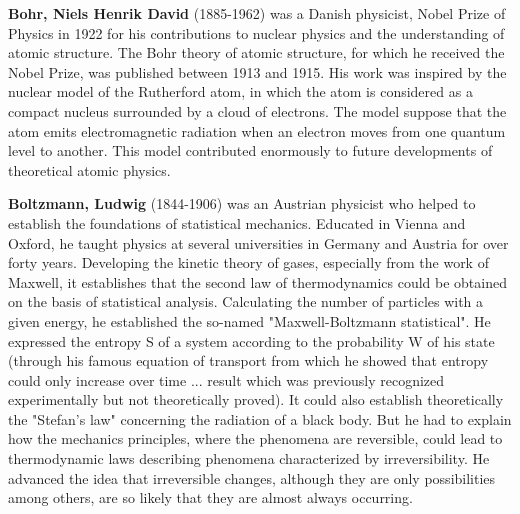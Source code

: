\textbf{Bohr, Niels Henrik David} (1885-1962) was a Danish physicist, Nobel Prize of Physics in 1922 for his contributions to nuclear physics and the understanding of atomic structure. The Bohr theory of atomic structure, for which he received the Nobel Prize, was published between 1913 and 1915. His work was inspired by the nuclear model of the Rutherford atom, in which the atom is considered as a compact nucleus surrounded by a cloud of electrons. The model suppose that the atom emits electromagnetic radiation when an electron moves from one quantum level to another. This model contributed enormously to future developments of theoretical atomic physics.

\textbf{Boltzmann, Ludwig} (1844-1906) was an Austrian physicist who helped to establish the foundations of statistical mechanics. Educated in Vienna and Oxford, he taught physics at several universities in Germany and Austria for over forty years. Developing the kinetic theory of gases, especially from the work of Maxwell, it establishes that the second law of thermodynamics could be obtained on the basis of statistical analysis. Calculating the number of particles with a given energy, he established the so-named "Maxwell-Boltzmann statistical". He expressed the entropy S of a system according to the probability W of his state (through his famous equation of transport from which he showed that entropy could only increase over time ... result which was previously recognized experimentally but not theoretically proved). It could also establish theoretically the "Stefan's law" concerning the radiation of a black body. But he had to explain how the mechanics principles, where the phenomena are reversible, could lead to thermodynamic laws describing phenomena characterized by irreversibility. He advanced the idea that irreversible changes, although they are only possibilities among others, are so likely that they are almost always occurring.

